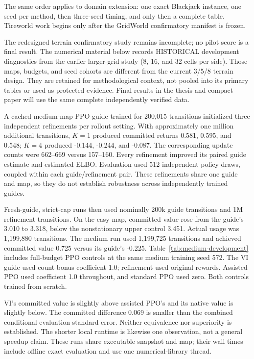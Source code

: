 The same order applies to domain extension: one exact Blackjack instance, one
seed per method, then three-seed timing, and only then a complete table.
Tireworld work begins only after the GridWorld confirmatory manifest is frozen.


The redesigned terrain confirmatory study remains incomplete; no pilot score
is a final result. The numerical material below records HISTORICAL development
diagnostics from the earlier larger-grid study (8, 16, and 32 cells per side).
Those maps, budgets, and seed cohorts are different from the current 3/5/8
terrain design. They are retained for methodological context, not pooled into
its primary tables or used as protected evidence. Final results in the thesis
and compact paper will use the same complete independently verified data.


A cached medium-map PPO guide trained for 200,015 transitions initialized three
independent refinements per rollout setting. With approximately one million
additional transitions, \(K=1\) produced committed returns 0.581, 0.595, and
0.548; \(K=4\) produced -0.144, -0.244, and -0.087. The corresponding update
counts were 662--669 versus 157--160. Every refinement improved its paired guide
estimate and estimated ELBO. Evaluation used 512 independent policy draws,
coupled within each guide/refinement pair. These refinements share one guide
and map, so they do not establish robustness across independently trained guides.


Fresh-guide, strict-cap runs then used nominally 200k guide transitions and 1M
refinement transitions. On the easy map, committed value rose from the guide's
3.010 to 3.318, below the nonstationary upper control 3.451. Actual usage was
1,199,880 transitions. The medium run used 1,199,725 transitions and achieved
committed value 0.725 versus its guide's -0.225.
Table~\ref{tab:medium-development} includes full-budget PPO controls at the same
medium training seed 572. The VI guide used count-bonus coefficient 1.0;
refinement used original rewards. Assisted PPO used coefficient 1.0 throughout,
and standard PPO used zero. Both controls trained from scratch.

VI's committed value is slightly above assisted PPO's and its native value is
slightly below. The committed difference 0.069 is smaller than the combined
conditional evaluation standard error. Neither equivalence nor superiority is
established. The shorter local runtime is likewise one observation, not a
general speedup claim. These runs share executable snapshot and map; their
wall times include offline exact evaluation and use one numerical-library thread.


